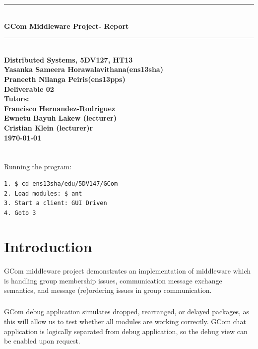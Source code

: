 \documentclass[a4paper,english,twoside]{article}
\def\author		{Yasanka Sameera Horawalavithana(ens13sha)}
\def\subauthor			{Praneeth Nilanga Peiris(ens13pps)}
\def\course			{Distributed Systems, 5DV127, HT13}
\def\delivery		{Deliverable 02}
\def\trivialname	{GCom Middleware Project}
\def\tutor			{Francisco Hernandez-Rodriguez}
\def\title			{Report}
\begin{document}
\begin{titlepage}

\newcommand{\HRule}{\rule{\linewidth}{0.5mm}}
\noindent
\HRule \\[0.4cm]
{ \huge \bfseries \trivialname - \title}\\[0.4cm] 
\HRule \\[1.5cm]

\noindent
\huge{\textbf{\course}} \\

\noindent
\huge{\textbf{\author}} \\
\huge{\textbf{\subauthor}} \\

\noindent
\huge{\textbf{\delivery}} \\

\noindent
\huge{\textbf{Tutors:}} \\
\huge{\textbf{\tutor }} \\ 
\huge{\textbf{Ewnetu Bayuh Lakew (lecturer)}} \\ 
\huge{\textbf{Cristian Klein (lecturer)r }} \\ 

\noindent
\huge{\textbf{\today}} \\
\\
\\
Running the program: 
\begin{verbatim}
1. $ cd ens13sha/edu/5DV147/GCom
2. Load modules: $ ant
3. Start a client: GUI Driven
4. Goto 3
\end{verbatim}






\end{titlepage}
\thispagestyle{empty}


\tableofcontents
\thispagestyle{empty}

\newpage
{}
\renewcommand{\baselinestretch}{1.5}
\section{Introduction}
\paragraph{}
GCom middleware project demonstrates an implementation of middleware which is handling group membership issues, communication message exchange semantics, and message (re)ordering issues in group communication.
\subparagraph{}
GCom debug application simulates dropped, rearranged, or delayed packages, as this will allow us to test whether all modules are working correctly. GCom chat application is logically separated from debug application, so the debug view can be enabled upon request.
\end{document}
